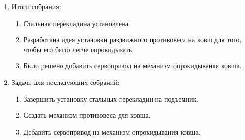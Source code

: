 \begin{enumerate}
\begin{enumerate}
    \end{enumerate}
    
	\item Итоги собрания: 
	\begin{enumerate}
	  \item Стальная перекладина установлена.
	  
	  \item Разработана идея установки раздвижного противовеса на ковш для того, чтобы его было легче опрокидывать.
	  
	  \item Было решено добавить сервопривод на механизм опрокидывания ковша.
	  
    \end{enumerate}
    
	\item Задачи для последующих собраний:
	\begin{enumerate}
	  \item Завершить установку стальных перекладин на подъемник.
	  
	  \item Создать механизм противовеса для ковша.
	  
	  \item Добавить сервопривод на механизм опрокидывания ковша.
	  
    \end{enumerate}     
\end{enumerate}
\fillpage